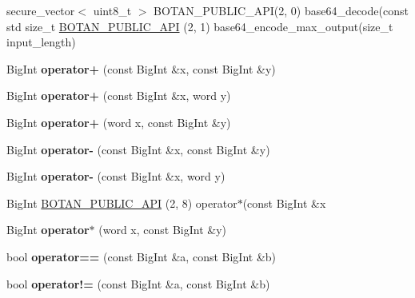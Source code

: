 \begin{DoxyCompactItemize}
\item 
secure\+\_\+vector$<$ uint8\+\_\+t $>$ B\+O\+T\+A\+N\+\_\+\+P\+U\+B\+L\+I\+C\+\_\+\+A\+PI(2, 0) base64\+\_\+decode(const std size\+\_\+t \hyperlink{namespace_botan_a835833515e6080a0d56a13ff99ef4958}{B\+O\+T\+A\+N\+\_\+\+P\+U\+B\+L\+I\+C\+\_\+\+A\+PI} (2, 1) base64\+\_\+encode\+\_\+max\+\_\+output(size\+\_\+t input\+\_\+length)
\item 
\mbox{\label{namespace_botan_a9e32cc5fc8e75531b11c6e6f51310d83}} 
Big\+Int {\bfseries operator+} (const Big\+Int \&x, const Big\+Int \&y)
\item 
\mbox{\label{namespace_botan_a37adccc7857d4594e403bf41c5a8476d}} 
Big\+Int {\bfseries operator+} (const Big\+Int \&x, word y)
\item 
\mbox{\label{namespace_botan_a5adb28cb65a6ef57526c285a2c1870bc}} 
Big\+Int {\bfseries operator+} (word x, const Big\+Int \&y)
\item 
\mbox{\label{namespace_botan_a66643ed3bed15c00235afd74dc52f674}} 
Big\+Int {\bfseries operator-\/} (const Big\+Int \&x, const Big\+Int \&y)
\item 
\mbox{\label{namespace_botan_a19d38462775851d306e1381ccf3468c9}} 
Big\+Int {\bfseries operator-\/} (const Big\+Int \&x, word y)
\item 
Big\+Int \hyperlink{namespace_botan_a33bceeeb9c924b9a9600daa1fe19b073}{B\+O\+T\+A\+N\+\_\+\+P\+U\+B\+L\+I\+C\+\_\+\+A\+PI} (2, 8) operator$\ast$(const Big\+Int \&x
\item 
\mbox{\label{namespace_botan_a0d21ef0e33c52a3d4624003b0d002bc7}} 
Big\+Int {\bfseries operator$\ast$} (word x, const Big\+Int \&y)
\item 
\mbox{\label{namespace_botan_af911990ac0bbc2915a52d87b8be9829c}} 
bool {\bfseries operator==} (const Big\+Int \&a, const Big\+Int \&b)
\item 
\mbox{\label{namespace_botan_a3134b689eace5f745309ca642881255c}} 
bool {\bfseries operator!=} (const Big\+Int \&a, const Big\+Int \&b)
\item 
\mbox{\label{namespace_botan_ac161333faf41df65f4bee80dc198c0e6}} 

\end{DoxyCompactItemize}
